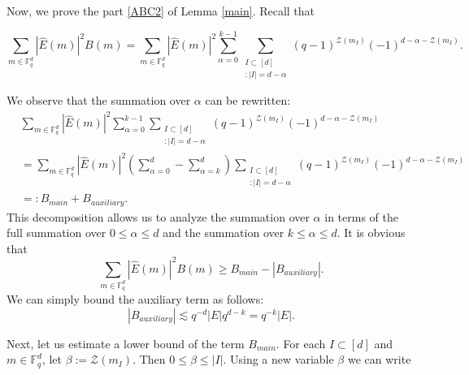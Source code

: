 \documentclass[a4paper,11pt]{amsart}
\numberwithin{equation}{section}
\def\Fq#1{\mathbb{F}_q^{#1}}
\def\pnorm#1#2{|#2|_{#1}}
\begin{document}
Now, we prove the part \ref{ABC2} of Lemma \ref{main}. Recall that 

\begin{equation*}
\sum_{m\in \Fq{d}}\pnorm{}{\widehat{E}(m)}^2B(m) = \sum_{m\in \Fq{d}}\pnorm{}{\widehat{E}(m)}^2\sum_{\alpha = 0}^{k-1}\sum_{\substack{{I \subset [d]}\\{:|I| = d-\alpha}}}(q-1)^{\mathcal{Z}(m_{I})}(-1)^{d-\alpha-\mathcal{Z}(m_I)}. 
\end{equation*}



We observe that the summation over $\alpha$ can be rewritten:
\begin{align*}
    &
    \sum_{m \in \mathbb{F}_q^d} |\widehat{E}(m)|^2 \sum_{\alpha = 0}^{k-1} \sum_{\substack{I \subset [d] \\ :|I| = d - \alpha}} (q - 1)^{\mathcal{Z}(m_I)} (-1)^{d - \alpha - \mathcal{Z}(m_I)} \\
    &
    =
    \sum_{m \in \mathbb{F}_q^d} |\widehat{E}(m)|^2 \left(\sum_{\alpha = 0}^{d} - \sum_{\alpha = k}^{d}\right) \sum_{\substack{I \subset [d] \\ :|I| = d - \alpha}} (q - 1)^{\mathcal{Z}(m_I)} (-1)^{d - \alpha - \mathcal{Z}(m_I)} \\
    &=: B_{main}+B_{auxiliary}. 
\end{align*} 
This decomposition allows us to analyze the summation over $\alpha$ in terms of the full summation over 
\( 0 \leq \alpha \leq d \) and the summation over  \( k \leq \alpha \leq d \). It is obvious that
\begin{equation}\label{mineq}
        \sum_{m\in \Fq{d}}\pnorm{}{\widehat{E}(m)}^2B(m) \geq B_{main}-|B_{auxiliary}|.
\end{equation}
We can simply bound the auxiliary term as follows:
\begin{equation}\label{aux}
    |B_{auxiliary}| \lesssim 
    q^{-d}|E|q^{d-k} = q^{-k}|E|.    
\end{equation}

Next, let us estimate a lower bound of the term $B_{main}.$  For each $I\subset [d]$ and $m\in \mathbb F_q^d$, let $\beta:=\mathcal{Z}(m_I)$. Then  $0\leq \beta \leq |I|$. Using a new variable $\beta$
 we can write
\end{document}
